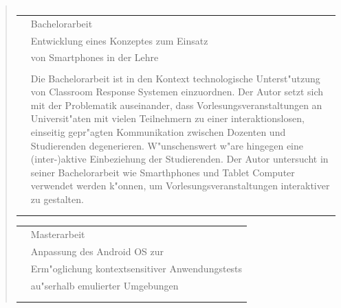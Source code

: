 \begin{quote}
\begin{tabular}{p{4cm}l}
	\end{tabular}
	\begin{tabular}{p{4cm}l}
		&Bachelorarbeit\\
		&\qquad Entwicklung eines Konzeptes zum Einsatz\\
		&\qquad von Smartphones in der Lehre\\\\
		&\begin{minipage}{10cm}
		Die Bachelorarbeit ist in den Kontext technologische Unterst"utzung von Classroom Response Systemen einzuordnen. Der Autor setzt sich mit der Problematik auseinander, dass Vorlesungsveranstaltungen an Universit"aten mit vielen Teilnehmern zu einer interaktionslosen, einseitig gepr"agten Kommunikation zwischen Dozenten und Studierenden degenerieren. W"unschenswert w"are hingegen eine (inter-)aktive Einbeziehung der Studierenden. Der Autor untersucht in seiner Bachelorarbeit wie Smarthphones und Tablet Computer verwendet werden k"onnen, um Vorlesungsveranstaltungen interaktiver zu gestalten.
		\end{minipage}\\\\\\
	\end{tabular}
%
	\begin{tabular}{p{4cm}l}
		&Masterarbeit\\
		&\qquad Anpassung des Android OS zur\\
		&\qquad Erm"oglichung kontextsensitiver Anwendungstests\\
		&\qquad au"serhalb emulierter Umgebungen\\\\
		&\begin{minipage}{10cm}

\end{minipage}
\end{tabular}
\end{quote}
